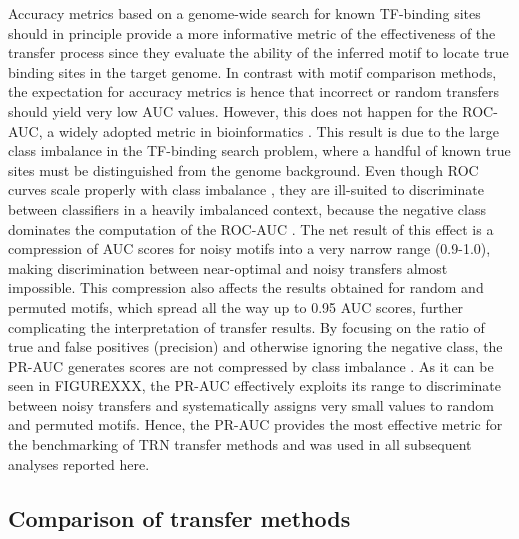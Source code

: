 Accuracy metrics based on a genome-wide search for known TF-binding sites
should in principle provide a more informative metric of the effectiveness of
the transfer process since they evaluate the ability of the inferred motif to
locate true binding sites in the target genome. In contrast with motif
comparison methods, the expectation for accuracy metrics is hence that
incorrect or random transfers should yield very low AUC values. However, this
does not happen for the ROC-AUC, a widely adopted metric in bioinformatics
\cite{saito2015precision}. This result is due to the large class imbalance in
the TF-binding search problem, where a handful of known true sites must be
distinguished from the genome background. Even though ROC curves scale properly
with class imbalance \cite{fawcett2006introduction}, they are ill-suited to
discriminate between classifiers in a heavily imbalanced context, because the
negative class dominates the computation of the ROC-AUC
\cite{davis2006relationship}. The net result of this effect is a compression of
AUC scores for noisy motifs into a very narrow range (0.9-1.0), making
discrimination between near-optimal and noisy transfers almost impossible. This
compression also affects the results obtained for random and permuted motifs,
which spread all the way up to 0.95 AUC scores, further complicating the
interpretation of transfer results. By focusing on the ratio of true and false
positives (precision) and otherwise ignoring the negative class, the PR-AUC
generates scores are not compressed by class imbalance
\cite{saito2015precision, davis2006relationship}. As it can be
seen in FIGUREXXX, the PR-AUC effectively exploits its range to discriminate
between noisy transfers and systematically assigns very small values to random
and permuted motifs. Hence, the PR-AUC provides the most effective metric for
the benchmarking of TRN transfer methods and was used in all subsequent
analyses reported here.

\subsection{Comparison of transfer methods}

